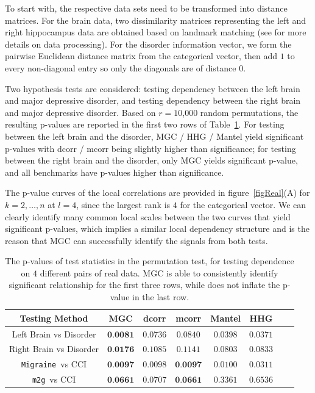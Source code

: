 \documentclass[11pt]{article}
\providecommand{\sct}[1]{{\sc \texttt{#1}}}
\newcommand{\Migraine}{\sct{Migraine}}
\newcommand{\mtg}{\sct{m2g}}
\begin{document}
To start with, the respective data sets need to be transformed into distance matrices. For the brain data, two dissimilarity matrices representing the left and right hippocampus data are obtained based on landmark matching (see \cite{ParkEtAl2011} for more details on data processing). For the disorder information vector,
we form the pairwise Euclidean distance matrix from the categorical vector, then add $1$ to every non-diagonal entry so only the diagonals are of distance $0$.

Two hypothesis tests are considered: testing dependency between the left brain and major depressive disorder, and testing dependency between the right brain and major depressive disorder. Based on $r=10$,$000$ random permutations, the resulting p-values are reported in the first two rows of Table~\ref{table1}. For testing between the left brain and the disorder, MGC / HHG / Mantel yield significant p-values with dcorr / mcorr being slightly higher than significance; for testing between the right brain and the disorder, only MGC yields significant p-value, and all benchmarks have p-values higher than significance. 

The p-value curves of the local correlations are provided in figure~\ref{figReal}(A) for $k=2,\ldots,n$ at $l=4$, since the largest rank is $4$ for the categorical vector. We can clearly identify many common local scales between the two curves that yield significant p-values, which implies a similar local dependency structure and is the reason that MGC can successfully identify the signals from both tests. %

\begin{table}[!t]
\Large
\renewcommand{\arraystretch}{0.5}
\centering
{\begin{tabular}{|c||c|c|c|c|c|c|c|}
\hline
Testing Method & MGC & dcorr & mcorr & Mantel & HHG \\
\hline
Left Brain vs Disorder  & $\textbf{0.0081}$ & $0.0736$ & $0.0840$ & $0.0398$ & $0.0371$ \\
\hline
Right Brain vs Disorder & $\textbf{0.0176}$ & $0.1085$ & $0.1141$  & $0.0803$ & $0.0833$\\
\hline
\Migraine~vs CCI & $\textbf{0.0097}$ & $0.0098$ & $\textbf{0.0097}$  & $0.0100$ & $0.0311$\\
\hline
\mtg~vs CCI & $\textbf{0.0661}$ & $0.0707$ & $\textbf{0.0661}$  & $0.3361$ & $0.6536$\\
\hline
\end{tabular}
\caption{The p-values of test statistics in the permutation test, for testing dependence on $4$ different pairs of real data. MGC is able to consistently identify significant relationship for the first three rows, while does not inflate the p-value in the last row.}
\label{table1}
}
\end{table}
\end{document}
